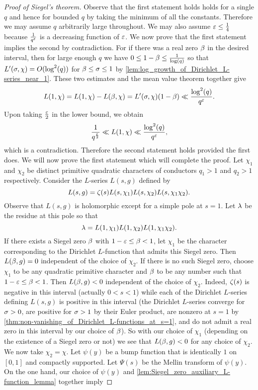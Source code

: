     \begin{proof}[Proof of Siegel's theorem]
      Observe that the first statement holds holds for a single $q$ and hence for bounded $q$ by taking the minimum of all the constants. Therefore we may assume $q$ arbitrarily large throughout. We may also assume $\varepsilon \le \frac{1}{4}$ because $\frac{1}{q^{\varepsilon}}$ is a decreasing function of $\varepsilon$. We now prove that the first statement implies the second by contradiction. For if there was a real zero $\beta$ in the desired interval, then for large enough $q$ we have $0 \le 1-\beta \le \frac{1}{\log(q)}$ so that $L'(\sigma,\chi) = O(\log^{2}(q))$ for $\beta \le \sigma \le 1$ by \cref{lem:log_growth_of_Dirichlet_L-series_near_1}. These two estimates and the mean value theorem together give
      \[
        L(1,\chi) = L(1,\chi)-L(\beta,\chi) = L'(\sigma,\chi)(1-\beta) \ll \frac{\log^{2}(q)}{q^{\varepsilon}}.
      \]
      Upon taking $\frac{\varepsilon}{2}$ in the lower bound, we obtain
      \[
        \frac{1}{q^{\frac{\varepsilon}{2}}} \ll L(1,\chi) \ll \frac{\log^{2}(q)}{q^{\varepsilon}},
      \]
      which is a contradiction. Therefore the second statement holds provided the first does. We will now prove the first statement which will complete the proof. Let $\chi_{1}$ and $\chi_{2}$ be distinct primitive quadratic characters of conductors $q_{1} > 1$ and $q_{2} > 1$ respectively. Consider the $L$-series $L(s,g)$ defined by
      \[
        L(s,g) = \zeta(s)L(s,\chi_{1})L(s,\chi_{2})L(s,\chi_{1}\chi_{2}).
      \]
      Observe that $L(s,g)$ is holomorphic except for a simple pole at $s = 1$. Let $\lambda$ be the residue at this pole so that
      \[
        \lambda = L(1,\chi_{1})L(1,\chi_{2})L(1,\chi_{1}\chi_{2}).
      \]
      If there exists a Siegel zero $\beta$ with $1-\varepsilon \le \beta < 1$, let $\chi_{1}$ be the character corresponding to the Dirichlet $L$-function that admits this Siegel zero. Then $L(\beta,g) = 0$ independent of the choice of $\chi_{2}$. If there is no such Siegel zero, choose $\chi_{1}$ to be any quadratic primitive character and $\beta$ to be any number such that $1-\varepsilon \le \beta < 1$. Then $L(\beta,g) < 0$ independent of the choice of $\chi_{2}$. Indeed, $\zeta(s)$ is negative in this interval (actually $0 < s < 1$) while each of the Dirichlet $L$-series defining $L(s,g)$ is positive in this interval (the Dirichlet $L$-series converge for $\sigma > 0$, are positive for $\sigma > 1$ by their Euler product, are nonzero at $s = 1$ by \cref{thm:non-vanishing_of_Dirichlet_L-functions_at_s=1}, and do not admit a real zero in this interval by our choice of $\beta$). So with our choice of $\chi_{1}$ (depending on the existence of a Siegel zero or not) we see that $L(\beta,g) < 0$ for any choice of $\chi_{2}$. We now take $\chi_{2} = \chi$. Let $\psi(y)$ be a bump function that is identically $1$ on $[0,1]$ and compactly supported. Let $\Psi(s)$ be the Mellin transform of $\psi(y)$. On the one hand, our choice of $\psi(y)$ and \cref{lem:Siegel_zero_auxiliary_L-function_lemma} together imply

\end{proof}
